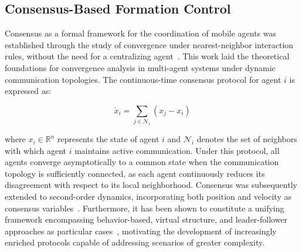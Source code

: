 \subsection{Consensus-Based Formation Control}

Consensus as a formal framework for the coordination of mobile agents was established through the study of convergence under nearest-neighbor interaction rules, without the need for a centralizing agent~\cite{jadbabaie2003coordination}. This work laid the theoretical foundations for convergence analysis in multi-agent systems under dynamic communication topologies. The continuous-time consensus protocol for agent $i$ is expressed as:

\begin{equation}
    \dot{x}_i = \sum_{j \in \mathcal{N}_i} \left( x_j - x_i \right)
    \label{eq:consenso}
\end{equation}

\noindent where $x_i \in \mathbb{R}^n$ represents the state of agent $i$ and $\mathcal{N}_i$ denotes the set of neighbors with which agent $i$ maintains active communication. Under this protocol, all agents converge asymptotically to a common state when the communication topology is sufficiently connected, as each agent continuously reduces its disagreement with respect to its local neighborhood. Consensus was subsequently extended to second-order dynamics, incorporating both position and velocity as consensus variables~\cite{ren2006consensus}. Furthermore, it has been shown to constitute a unifying framework encompassing behavior-based, virtual structure, and leader-follower approaches as particular cases~\cite{ren2006consensus}, motivating the development of increasingly enriched protocols capable of addressing scenarios of greater complexity.